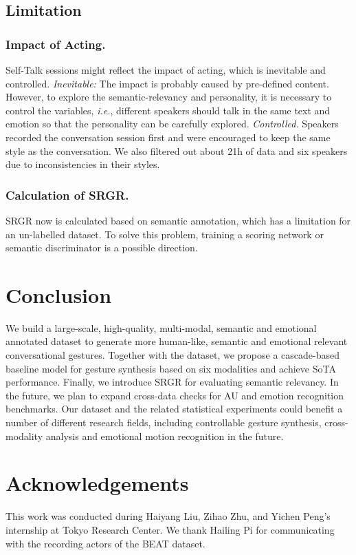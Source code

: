 \documentclass[runningheads]{llncs}
\begin{document}
\subsection{Limitation}
\subsubsection{Impact of Acting.} Self-Talk sessions might reflect the impact of acting, which is inevitable and controlled. \textit{Inevitable:} The impact is probably caused by pre-defined content. However, to explore the semantic-relevancy and personality, it is necessary to control the variables, \textit{i.e.}, different speakers should talk in the same text and emotion so that the personality can be carefully explored. \textit{Controlled.} Speakers recorded the conversation session first and were encouraged to keep the same style as the conversation. We also filtered out about 21h of data and six speakers due to inconsistencies in their styles.

\subsubsection{Calculation of SRGR.} SRGR now is calculated based on semantic annotation, which has a limitation for an un-labelled dataset. To solve this problem, training a scoring network or semantic discriminator is a possible direction. \section{Conclusion}
We build a large-scale, high-quality, multi-modal, semantic and emotional annotated dataset to generate more human-like, semantic and emotional relevant conversational gestures. Together with the dataset, we propose a cascade-based baseline model for gesture synthesis based on six modalities and achieve SoTA performance. Finally, we introduce SRGR for evaluating semantic relevancy. In the future, we plan to expand cross-data checks for AU and emotion recognition benchmarks. Our dataset and the related statistical experiments could benefit a number of different research fields, including controllable gesture synthesis, cross-modality analysis and emotional motion recognition in the future.

\section{Acknowledgements}
This work was conducted during Haiyang Liu, Zihao Zhu, and Yichen Peng’s internship at Tokyo Research Center. We thank Hailing Pi for communicating with the recording actors of the BEAT dataset. 

\newpage
\appendix
\end{document}
